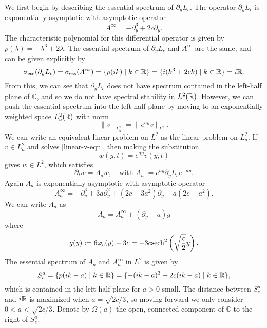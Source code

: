 We first begin by describing the essential spectrum of \(\partial_y L_c\). The operator \(\partial_y L_c\) is exponentially asymptotic with asymptotic operator
\begin{equation}
	A^\infty = - \partial_y^3 + 2 c\partial_y.
\end{equation}
The characteristic polynomial for this differential operator is given by \(p (\lambda) = -\lambda^3 + 2\lambda\). The essential spectrum of \(\partial_y L_c\) and \(A^\infty\) are the same, and can be given explicitly by
\begin{equation}
	\sigma_{\mathrm{ess}}(\partial_y L_c) = \sigma_{\mathrm{ess}}(A^\infty) = \{p(ik) \mid k \in \mathbb{R}\} = \{i(k^3 +2c k) \mid k \in \mathbb{R}\} = i \mathbb{R}.
\end{equation}
From this, we can see that \(\partial_y L_c\) does not have spectrum contained in the left-half plane of \(\mathbb C\), and so we do not have spectral stability in \(L^2(\mathbb{R})\). However, we can push the essential spectrum into the left-half plane by moving to an exponentially weighted space \(L^2_a(\mathbb{R})\) with norm 
\begin{equation}
	\|v\|_{L^2_a} = \|e^{ay} v\|_{L^2}.
\end{equation}
We can write an equivalent linear problem on \(L^2\) as the linear problem on \(L^2_a\). If \(v\in L^2_a\) and solves \cref{linear-v-eqn}, then making the substitution 
\begin{equation}
	w(y,t) = e^{ay} v(y,t)
\end{equation}
gives \(w\in L^2\), which satisfies
\begin{equation}
	\partial_t w = A_a w, \quad \text{with } A_a := e^{ay} \partial_y L_c e^{-ay}.
\end{equation}
Again \(A_a\) is exponentially asymptotic with asymptotic operator
\begin{equation}
	A_a^\infty = - \partial_y^3 + 3a\partial_y^2 + (2c - 3a^2) \partial_y - a(2c - a^2).
\end{equation}
We can write \(A_a\) as 
\begin{equation}
	A_a = A_a^\infty + (\partial_y - a)g
\end{equation}
where 
\begin{equation}
	g(y) := 6\varphi_c(y) - 3c = - 3c\mathrm{sech}^2\left(\sqrt{\frac c 2} y \right).
\end{equation}
The essential spectrum of \(A_a\) and \(A_a^\infty\) in \(L^2\) is given by
\begin{equation}
	S^a_e = \{p(ik - a) \mid k \in \mathbb{R}\}= \{ - (ik - a)^3 + 2c(ik - a) \mid k \in \mathbb{R}\},
\end{equation}
which is contained in the left-half plane for \(a>0\) small. The distance between \(S^a_e\) and \(i\mathbb{R}\) is maximized when \(a = \sqrt{2c/3}\), so moving forward we only consider \(0< a < \sqrt{2c/3}\). Denote by \(\Omega(a)\) the open, connected component of \(\mathbb C\) to the right of \(S^a_e\). 

